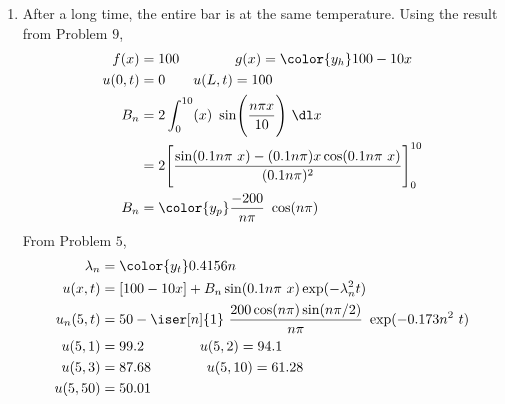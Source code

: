 \begin{enumerate}
    \item After a long time, the entire bar is at the same temperature. Using the
          result from Problem $ 9 $,
          \begin{align}
              f(x)    & = 100   \qquad\qquad g(x) = \color{y_h} 100 - 10x \\
              u(0, t) & = 0 \qquad u(L, t) = 100                          \\
              B_n     & = 2 \int_{0}^{10} (x)\ \sin\Biggl(
              \frac{n\pi x}{10}\Biggr)\ \dl x                             \\
                      & = 2\Bigg[ \frac{\sin(0.1n\pi\ x) -
              (0.1n\pi)x\cos(0.1n\pi\ x)}{(0.1n\pi)^2} \Bigg]_0^{10}      \\
              B_n     & = \color{y_p} \frac{-200}{n\pi}\ \cos(n\pi)
          \end{align}
          From Problem $ 5 $,
          \begin{align}
              \lambda_n & = \color{y_t} 0.4156n                                      \\
              u(x, t)   & = [100 - 10x] + B_n \sin(0.1n\pi\ x) \exp(-\lambda_n^2 t)  \\
              u_n(5, t) & = 50 - \iser[n]{1}\ \frac{200\cos(n\pi)\sin(n\pi/2)}{n\pi}
              \ \exp(-0.173n^2\ t)                                                   \\
              u(5, 1)   & = 99.2 \qquad\qquad u(5, 2) = 94.1                         \\
              u(5, 3)   & = 87.68 \qquad\qquad u(5, 10) = 61.28                      \\
              u(5, 50)  & = 50.01
          \end{align}


\end{enumerate}
